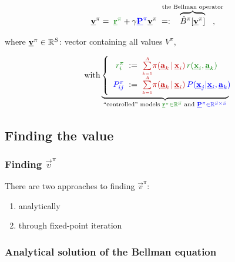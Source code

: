\begin{frame}
	

	\begin{equation}
		\vec v^\pi
		= \; {\color{reward}\vec r^\pi} 
			+ \gamma {\color{trans}\vec P^\pi} \vec v^\pi \; =: \kern-3ex\overbrace{\hat B^\pi[\vec v^\pi]}^{\text{the Bellman operator}}\kern-3ex,
	\end{equation}
	
	where $\underline{\mathbf{v}}^\pi \in \mathbb{R}^S$: vector containing all values $V^\pi$,
	
	\begin{align}
		\quad \text{with}  \underbrace{ \left\{ \begin{array}{rcl} 
				{\color{reward}r^\pi_i} &\kern-1ex:=\kern-1ex& 
					{\color{policy} \smallsum{k=1}{A} 
					\pi(\vec a_k \,|\, \vec x_i)} \, 
					{\color{reward} r(\vec x_i, \vec a_k)} \\
				{\color{trans}P^\pi_{ij}} &\kern-1ex:=\kern-1ex& 
					{\color{policy}\smallsum{k=1}{A} 
					\pi(\vec a_k \,|\, \vec x_i)} \, 
					{\color{trans}P(\vec x_j | \vec x_i, \vec a_k)} \\
			\end{array} 
			\right.\kern-2ex}_{
				\text{``controlled'' models }
				{\color{reward}\vec r^\pi \in \R^S}
				\text{ and }{\color{trans}\vec P^\pi \in \R^{S \times S}}
			}
	\end{align}
	
\end{frame}

\subsection{Finding the value}

\begin{frame}\frametitle{Finding $\vec v^\pi$}

There are two approaches to finding $\vec v^\pi$:

\begin{enumerate}
\item analytically
\item through fixed-point iteration
\end{enumerate}

\end{frame}

\subsubsection{Analytical solution of the Bellman equation}

